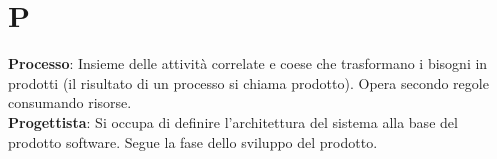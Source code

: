 \section{P}
\textbf{Processo}: Insieme delle attività correlate e coese che trasformano i bisogni in prodotti (il risultato di un processo si
chiama prodotto). Opera secondo regole consumando risorse.\\
\textbf{Progettista}: Si occupa di definire l'architettura del sistema alla base del prodotto software. Segue la fase dello sviluppo del prodotto.